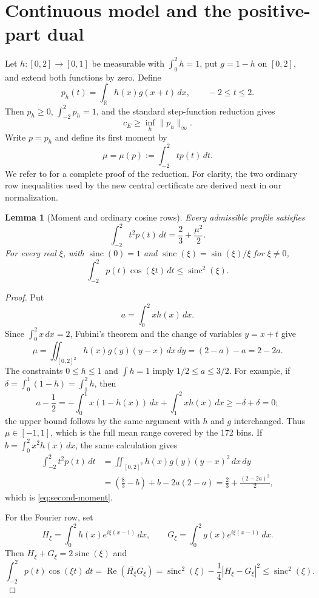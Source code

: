 \documentclass[11pt]{amsart}
\newtheorem{lemma}[theorem]{Lemma}
\DeclareMathOperator{\sinc}{sinc}
\newcommand{\R}{\mathbb R}
\newcommand{\dd}{\,d}
\begin{document}
\section{Continuous model and the positive-part dual}

Let $h:[0,2]\to[0,1]$ be measurable with $\int_0^2h=1$, put $g=1-h$
on $[0,2]$, and extend both functions by zero.  Define
\[
 p_h(t)=\int_{\R}h(x)g(x+t)\dd x,
 \qquad -2\le t\le2.
\]
Then $p_h\ge0$, $\int_{-2}^2p_h=1$, and the standard step-function reduction
gives
\[
 c_E\ge \inf_h\|p_h\|_\infty.
\]
Write $p=p_h$ and define its first moment by
\begin{equation}\label{eq:mean}
 \mu=\mu(p):=\int_{-2}^2 t p(t)\dd t.
\end{equation}
We refer to \cite{White2022,Price2026} for a complete proof of the reduction.
For clarity, the two ordinary row inequalities used by the new central
certificate are derived next in our normalization.

\begin{lemma}[Moment and ordinary cosine rows]\label{lem:ordinary-rows}
Every admissible profile satisfies
\begin{equation}\label{eq:second-moment}
 \int_{-2}^2t^2p(t)\dd t=\frac23+\frac{\mu^2}{2}.
\end{equation}
For every real $\xi$, with $\sinc(0)=1$ and
$\sinc(\xi)=\sin(\xi)/\xi$ for $\xi\ne0$,
\begin{equation}\label{eq:ordinary-cos}
 \int_{-2}^2p(t)\cos(\xi t)\dd t\le\sinc^2(\xi).
\end{equation}
\end{lemma}

\begin{proof}
Put
\[
 a=\int_0^2xh(x)\dd x.
\]
Since $\int_0^2x\dd x=2$, Fubini's theorem and the change of variables
$y=x+t$ give
\[
 \mu=\iint_{[0,2]^2}h(x)g(y)(y-x)\dd x\dd y
     =(2-a)-a=2-2a.
\]
The constraints $0\le h\le1$ and $\int h=1$ imply
$1/2\le a\le3/2$.  For example, if
$\delta=\int_0^1(1-h)=\int_1^2h$, then
\[
 a-\frac12
 =-\int_0^1x(1-h(x))\dd x+\int_1^2xh(x)\dd x
 \ge-\delta+\delta=0;
\]
the upper bound follows by the same argument with $h$ and $g$ interchanged.
Thus $\mu\in[-1,1]$, which is the full mean range covered by the 172 bins.
If $b=\int_0^2x^2h(x)\dd x$, the same calculation gives
\[
 \begin{aligned}
 \int_{-2}^2t^2p(t)\dd t
 &=\iint_{[0,2]^2}h(x)g(y)(y-x)^2\dd x\dd y\\
 &=\left(\frac83-b\right)+b-2a(2-a)
  =\frac23+\frac{(2-2a)^2}{2},
 \end{aligned}
\]
which is \eqref{eq:second-moment}.

For the Fourier row, set
\[
 H_\xi=\int_0^2h(x)e^{i\xi(x-1)}\dd x,
 \qquad
 G_\xi=\int_0^2g(x)e^{i\xi(x-1)}\dd x.
\]
Then $H_\xi+G_\xi=2\sinc(\xi)$ and
\[
 \int_{-2}^2p(t)\cos(\xi t)\dd t
 =\operatorname{Re}(\overline{H_\xi}G_\xi)
 =\sinc^2(\xi)-\frac14|H_\xi-G_\xi|^2
 \le\sinc^2(\xi).
\]
\end{proof}
\end{document}
